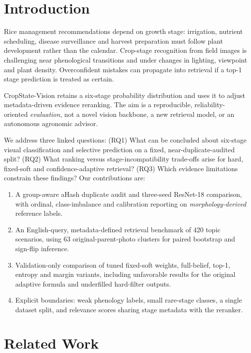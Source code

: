\documentclass[conference,a4paper]{IEEEtran}
\begin{document}
\section{Introduction}

Rice management recommendations depend on growth stage: irrigation, nutrient scheduling, disease surveillance and harvest preparation must follow plant development rather than the calendar. Crop-stage recognition from field images is challenging near phenological transitions and under changes in lighting, viewpoint and plant density. Overconfident mistakes can propagate into retrieval if a top-1 stage prediction is treated as certain.

CropState-Vision retains a six-stage probability distribution and uses it to adjust metadata-driven evidence reranking. The aim is a reproducible, reliability-oriented \emph{evaluation}, not a novel vision backbone, a new retrieval model, or an autonomous agronomic advisor.

We address three linked questions: (RQ1) What can be concluded about six-stage visual classification and selective prediction on a fixed, near-duplicate-audited split? (RQ2) What ranking versus stage-incompatibility trade-offs arise for hard, fixed-soft and confidence-adaptive retrieval? (RQ3) Which evidence limitations constrain these findings? Our contributions are:
\begin{enumerate}
    \item A group-aware aHash duplicate audit and three-seed ResNet-18 comparison, with ordinal, class-imbalance and calibration reporting on \emph{morphology-derived} reference labels.
    \item An English-query, metadata-defined retrieval benchmark of 420 topic scenarios, using 63 original-parent-photo clusters for paired bootstrap and sign-flip inference.
    \item Validation-only comparison of tuned fixed-soft weights, full-belief, top-1, entropy and margin variants, including unfavorable results for the original adaptive formula and underfilled hard-filter outputs.
    \item Explicit boundaries: weak phenology labels, small rare-stage classes, a single dataset split, and relevance scores sharing stage metadata with the reranker.
\end{enumerate}

\section{Related Work}
\end{document}
